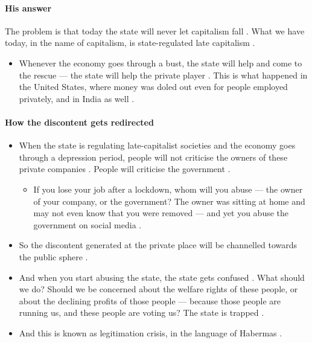 \paragraph{His answer}
\begin{KeyConcept}
The problem is that today the state will never let capitalism fall . What we have today, in the name of capitalism, is state-regulated late capitalism .
\end{KeyConcept}

\begin{itemize}
    \item Whenever the economy goes through a bust, the state will help and come to the rescue --- the state will help the private player . This is what happened in the United States, where money was doled out even for people employed privately, and in India as well .
\end{itemize}

\paragraph{How the discontent gets redirected}
\begin{itemize}
    \item When the state is regulating late-capitalist societies and the economy goes through a depression period, people will not criticise the owners of these private companies . People will criticise the government .
    \begin{itemize}
        \item If you lose your job after a lockdown, whom will you abuse --- the owner of your company, or the government?  The owner was sitting at home and may not even know that you were removed --- and yet you abuse the government on social media .
    \end{itemize}
    \item So the discontent generated at the private place will be channelled towards the public sphere .
    \item And when you start abusing the state, the state gets confused . What should we do? Should we be concerned about the welfare rights of these people, or about the declining profits of those people --- because those people are running us, and these people are voting us? The state is trapped .
    \item And this is known as legitimation crisis, in the language of Habermas .
\end{itemize}

